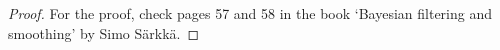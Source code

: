 \begin{proof}
For the proof, check pages 57 and 58 in the book `Bayesian filtering and smoothing' by Simo Särkkä. 
\end{proof}















